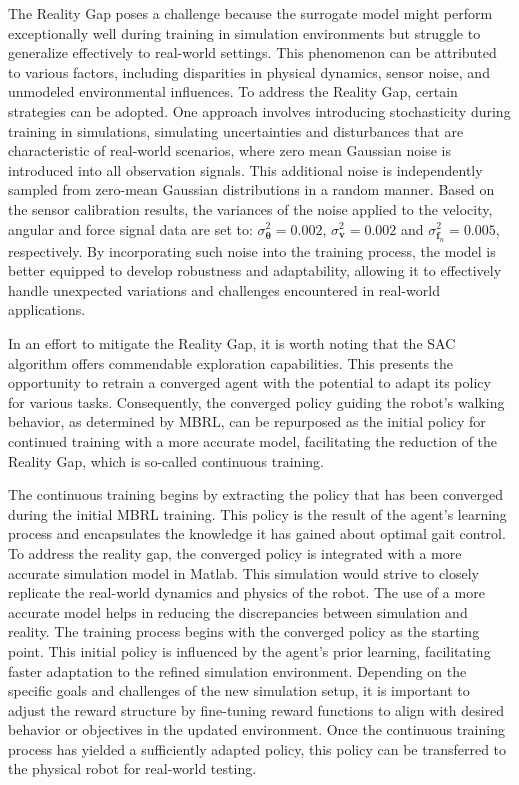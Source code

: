 The Reality Gap poses a challenge because the surrogate model might perform exceptionally well during training in simulation environments but struggle to generalize effectively to real-world settings. This phenomenon can be attributed to various factors, including disparities in physical dynamics, sensor noise, and unmodeled environmental influences. To address the Reality Gap, certain strategies can be adopted. One approach involves introducing stochasticity during training in simulations, simulating uncertainties and disturbances that are characteristic of real-world scenarios, where zero mean Gaussian noise is introduced into all observation signals. This additional noise is independently sampled from zero-mean Gaussian distributions in a random manner. Based on the sensor calibration results, the variances of the noise applied to the velocity, angular and force signal data are set to: $\sigma_{\pmb{\theta}}^2 = 0.002$, $\sigma_{\mathbf{v}}^2 = 0.002$ and $\sigma_{\mathbf{f}_n}^2 = 0.005$, respectively. By incorporating such noise into the training process, the model is better equipped to develop robustness and adaptability, allowing it to effectively handle unexpected variations and challenges encountered in real-world applications.

In an effort to mitigate the Reality Gap, it is worth noting that the SAC algorithm offers commendable exploration capabilities. This presents the opportunity to retrain a converged agent with the potential to adapt its policy for various tasks. Consequently, the converged policy guiding the robot's walking behavior, as determined by MBRL, can be repurposed as the initial policy for continued training with a more accurate model, facilitating the reduction of the Reality Gap, which is so-called continuous training.

The continuous training begins by extracting the policy that has been converged during the initial MBRL training. This policy is the result of the agent's learning process and encapsulates the knowledge it has gained about optimal gait control. To address the reality gap, the converged policy is integrated with a more accurate simulation model in Matlab. This simulation would strive to closely replicate the real-world dynamics and physics of the robot. The use of a more accurate model helps in reducing the discrepancies between simulation and reality. The training process begins with the converged policy as the starting point. This initial policy is influenced by the agent's prior learning, facilitating faster adaptation to the refined simulation environment. Depending on the specific goals and challenges of the new simulation setup, it is important to adjust the reward structure by fine-tuning reward functions to align with desired behavior or objectives in the updated environment. Once the continuous training process has yielded a sufficiently adapted policy, this policy can be transferred to the physical robot for real-world testing. 